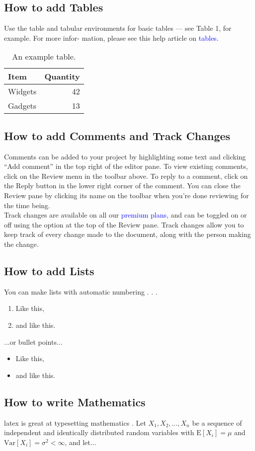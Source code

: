 \documentclass{article}
\begin{document}
\subsection{How to add Tables}
Use the table and tabular environments for basic tables — see Table 1, for example. For more infor-
mation, please see this help article on  \textcolor{blue}{tables}.
\begin{table}[h]
    \centering
    \begin{tabular}{|l|r|}
        \hline
        Item & Quantity \\
        \hline
        Widgets & 42 \\
        Gadgets & 13 \\
        \hline
    \end{tabular}
    \caption{An example table.}
\end{table}
\subsection{How to add Comments and Track Changes}
Comments can be added to your project by highlighting some text and clicking “Add comment” in
the top right of the editor pane. To view existing comments, click on the Review menu in the toolbar
above. To reply to a comment, click on the Reply button in the lower right corner of the comment.
You can close the Review pane by clicking its name on the toolbar when you’re done reviewing for the
time being.\\
Track changes are available on all our  \textcolor{blue}{premium plans}, and can be toggled on or off using the option
at the top of the Review pane. Track changes allow you to keep track of every change made to the
document, along with the person making the change.
\subsection{How to add Lists}
You can make lists with automatic numbering . . .
\begin{enumerate}
    \item Like this,
    \item and like this.
\end{enumerate}
...or bullet points...
\begin{itemize}
    \item Like this,
    \item and like this.
\end{itemize}
\subsection{How to write Mathematics}
latex is great at typesetting mathematics . Let $X_1, X_2, \ldots, X_n$ be a sequence of independent and identically distributed random variables with $\mathrm{E}[X_i] = \mu$ and $\mathrm{Var}[X_i] = \sigma^2 < \infty$, and let...\\
\end{document}
